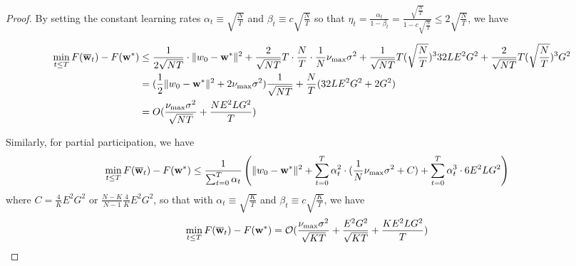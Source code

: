 \begin{proof}
	By setting the constant learning rates $\alpha_{t}\equiv\sqrt{\frac{N}{T}}$
	and $\beta_{t}\equiv c\sqrt{\frac{N}{T}}$ so that $\eta_{t}=\frac{\alpha_{t}}{1-\beta_{t}}=\frac{\sqrt{\frac{N}{T}}}{1-c\sqrt{\frac{N}{T}}}\leq2\sqrt{\frac{N}{T}}$,
	we have 
	
	\begin{align*}
	\min_{t\leq T}F({\overline{\mathbf{w}}}_{t})-F({\mathbf{w}}^{\ast}) & \leq\frac{1}{2\sqrt{NT}}\cdot\|w_{0}-{\mathbf{w}}^{\ast}\|^{2}+\frac{2}{\sqrt{NT}}T\cdot\frac{N}{T}\cdot\frac{1}{N}\nu_{\max}\sigma^{2}+\frac{1}{\sqrt{NT}}T(\sqrt{\frac{N}{T}})^{3}32LE^{2}G^{2}+\frac{2}{\sqrt{NT}}T(\sqrt{\frac{N}{T}})^{3}G^{2}\\
	& =(\frac{1}{2}\|w_{0}-{\mathbf{w}}^{\ast}\|^{2}+2\nu_{\max}\sigma^{2})\frac{1}{\sqrt{NT}}+\frac{N}{T}(32LE^{2}G^{2}+2G^{2})\\
	& =O(\frac{\nu_{\max}\sigma^{2}}{\sqrt{NT}}+\frac{NE^{2}LG^{2}}{T})
	\end{align*}
	
	Similarly, for partial participation, we have 
	\begin{align*}
	\min_{t\leq T}F({\overline{\mathbf{w}}}_{t})-F({\mathbf{w}}^{\ast}) & \leq\frac{1}{\sum_{t=0}^{T}\alpha_{t}}\left(\|w_{0}-{\mathbf{w}}^{\ast}\|^{2}+\sum_{t=0}^{T}\alpha_{t}^{2}\cdot(\frac{1}{N}\nu_{\max}\sigma^{2}+C)+\sum_{t=0}^{T}\alpha_{t}^{3}\cdot6E^{2}LG^{2}\right)
	\end{align*}
	where $C=\frac{4}{K}E^{2}G^{2}$ or $\frac{N-K}{N-1}\frac{4}{K}E^{2}G^{2}$,
	so that with $\alpha_{t}\equiv\sqrt{\frac{K}{T}}$ and $\beta_{t}\equiv c\sqrt{\frac{K}{T}}$,
	we have 
	\begin{align*}
	\min_{t\leq T}F({\overline{\mathbf{w}}}_{t})-F({\mathbf{w}}^{\ast}) & =\mathcal{O}(\frac{\nu_{\max}\sigma^{2}}{\sqrt{KT}}+\frac{E^{2}G^{2}}{\sqrt{KT}}+\frac{KE^{2}LG^{2}}{T})
	\end{align*}
\end{proof}